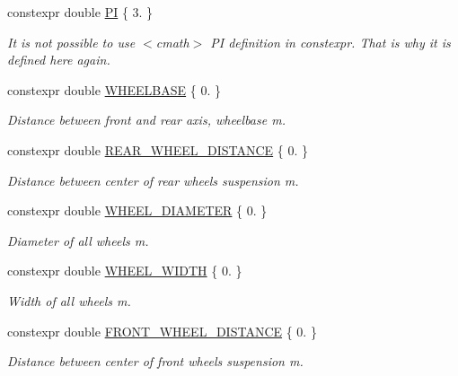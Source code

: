 \begin{DoxyCompactItemize}
\item 
constexpr double \hyperlink{namespacecar__config_a90cb9957197db8924811c447bc98703a}{PI} \{ 3. \}
\begin{DoxyCompactList}\small\item\em It is not possible to use $<$cmath$>$ PI definition in constexpr. That is why it is defined here again. \end{DoxyCompactList}\item 
constexpr double \hyperlink{namespacecar__config_a4e9e4925d43a88de91b13bedafabce67}{W\+H\+E\+E\+L\+B\+A\+SE} \{ 0. \}
\begin{DoxyCompactList}\small\item\em Distance between front and rear axis, wheelbase  m. \end{DoxyCompactList}\item 
constexpr double \hyperlink{namespacecar__config_a43e668702c6dc662ff95f80047ee5500}{R\+E\+A\+R\+\_\+\+W\+H\+E\+E\+L\+\_\+\+D\+I\+S\+T\+A\+N\+CE} \{ 0. \}
\begin{DoxyCompactList}\small\item\em Distance between center of rear wheels suspension  m. \end{DoxyCompactList}\item 
constexpr double \hyperlink{namespacecar__config_a6f064e331d6d85d46028dfbe75f063dd}{W\+H\+E\+E\+L\+\_\+\+D\+I\+A\+M\+E\+T\+ER} \{ 0. \}
\begin{DoxyCompactList}\small\item\em Diameter of all wheels  m. \end{DoxyCompactList}\item 
constexpr double \hyperlink{namespacecar__config_ace29186cd9605cde6edd0fd9b814df63}{W\+H\+E\+E\+L\+\_\+\+W\+I\+D\+TH} \{ 0. \}
\begin{DoxyCompactList}\small\item\em Width of all wheels  m. \end{DoxyCompactList}\item 
constexpr double \hyperlink{namespacecar__config_a80d9d6f97a63ffcaba87b65a9e1e29e4}{F\+R\+O\+N\+T\+\_\+\+W\+H\+E\+E\+L\+\_\+\+D\+I\+S\+T\+A\+N\+CE} \{ 0. \}
\begin{DoxyCompactList}\small\item\em Distance between center of front wheels suspension  m. \end{DoxyCompactList}\item 

\end{DoxyCompactItemize}
